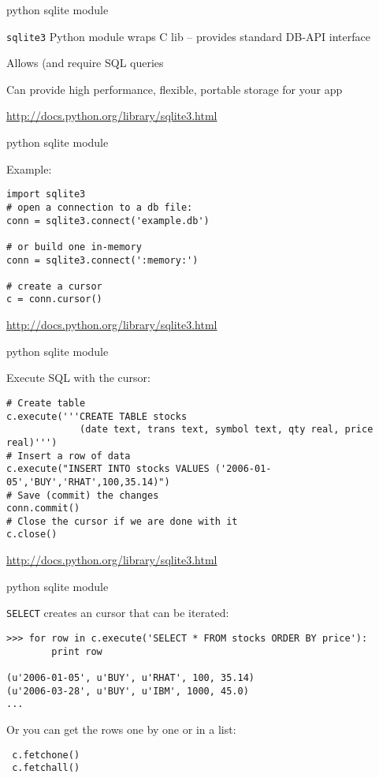 \documentclass{beamer}
\begin{document}
\begin{frame}[fragile]{python sqlite module}

\vfill
{\Large \verb|sqlite3| Python module wraps C lib -- provides standard DB-API interface}

\vfill
{\Large Allows (and require SQL queries}

\vfill
{\Large Can provide high performance, flexible, portable storage for your app}

\vfill
\url{http://docs.python.org/library/sqlite3.html}
\end{frame} 

\begin{frame}[fragile]{python sqlite module}

{\Large Example:}

\begin{verbatim}
import sqlite3
# open a connection to a db file:
conn = sqlite3.connect('example.db')

# or build one in-memory
conn = sqlite3.connect(':memory:')

# create a cursor
c = conn.cursor()
\end{verbatim}

\vfill
\url{http://docs.python.org/library/sqlite3.html}
\end{frame} 


\begin{frame}[fragile]{python sqlite module}

{\Large Execute SQL with the cursor:}

\begin{verbatim}
# Create table
c.execute('''CREATE TABLE stocks
             (date text, trans text, symbol text, qty real, price real)''')
# Insert a row of data
c.execute("INSERT INTO stocks VALUES ('2006-01-05','BUY','RHAT',100,35.14)")
# Save (commit) the changes
conn.commit()
# Close the cursor if we are done with it
c.close()
\end{verbatim}

\vfill
\url{http://docs.python.org/library/sqlite3.html}
\end{frame} 

\begin{frame}[fragile]{python sqlite module}

{\large \verb|SELECT| creates an cursor that can be iterated:}

\begin{verbatim}
>>> for row in c.execute('SELECT * FROM stocks ORDER BY price'):
        print row

(u'2006-01-05', u'BUY', u'RHAT', 100, 35.14)
(u'2006-03-28', u'BUY', u'IBM', 1000, 45.0)
...
\end{verbatim}

{\large Or you can get the rows one by one or in a list:}

\begin{verbatim}
 c.fetchone()
 c.fetchall()
\end{verbatim}

\end{frame} 
\end{document}

